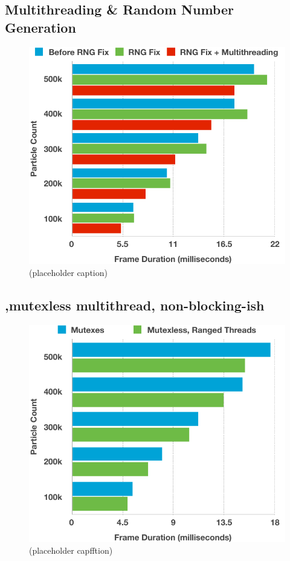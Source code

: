 \documentclass[11pt, a4paper, twocolumn]{article}
\begin{document}
\subsection{Multithreading \& Random Number Generation}

\begin{figure}[h]
\includegraphics[width=\linewidth]{initial-rng-multithread}
\caption{(placeholder caption)}
\label{fig:initial-rng-multithread}
\end{figure}

\subsection{,mutexless multithread, non-blocking-ish}

\begin{figure}[h]
\includegraphics[width=\linewidth]{mutexes-rangedthreads}
\caption{(placeholder capfftion)}
\label{fig:mutexes-rangedthreads}
\end{figure}
\end{document}
